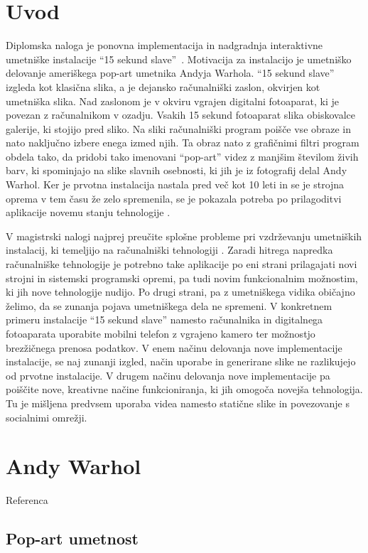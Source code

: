 \chapter{Uvod}
Diplomska naloga je ponovna implementacija in nadgradnja interaktivne
umetniške instalacije ``15 sekund slave''~\cite{leonardo}. Motivacija za
instalacijo je umetniško delovanje ameriškega pop-art umetnika Andyja Warhola.
``15 sekund slave'' izgleda kot klasična slika, a je dejansko računalniški
zaslon, okvirjen kot umetniška slika. Nad zaslonom je v okviru vgrajen
digitalni fotoaparat, ki je povezan z računalnikom v ozadju. Vsakih 15 sekund
fotoaparat slika obiskovalce galerije, ki stojijo pred sliko. Na sliki
računalniški program poišče vse obraze in nato naključno izbere enega izmed
njih. Ta obraz nato z grafičnimi filtri program obdela tako, da pridobi tako
imenovani ``pop-art'' videz z manjšim številom živih barv, ki spominjajo na
slike slavnih osebnosti, ki jih je iz fotografij delal Andy Warhol. Ker je
prvotna instalacija nastala pred več kot 10 leti in se je strojna oprema v tem
času že zelo spremenila, se je pokazala potreba po prilagoditvi aplikacije
novemu stanju tehnologije \cite{trifonova}.

V magistrski nalogi najprej preučite splošne probleme pri vzdrževanju
umetniških instalacij, ki temeljijo na računalniški tehnologiji
\cite{miller1,miller2,digitalartconservation}. Zaradi hitrega napredka
računalniške tehnologije je potrebno take aplikacije po eni strani prilagajati
novi strojni in sistemski programski opremi, pa tudi novim funkcionalnim
možnostim, ki jih nove tehnologije nudijo. Po drugi strani, pa z umetniškega
vidika običajno želimo, da se zunanja pojava umetniškega dela ne spremeni. V
konkretnem primeru instalacije ``15 sekund slave'' namesto računalnika in
digitalnega fotoaparata uporabite mobilni telefon z vgrajeno kamero ter
možnostjo brezžičnega prenosa podatkov. V enem načinu delovanja nove
implementacije instalacije, se naj zunanji izgled, način uporabe in generirane
slike ne razlikujejo od prvotne instalacije. V drugem načinu delovanja nove
implementacije pa poiščite nove, kreativne načine funkcioniranja, ki jih
omogoča novejša tehnologija. Tu je mišljena predvsem uporaba videa namesto
statične slike in povezovanje s socialnimi omrežji.

\chapter{Andy Warhol}
Referenca~\cite{wiki:AndyWarhol}
\section{Pop-art umetnost}

